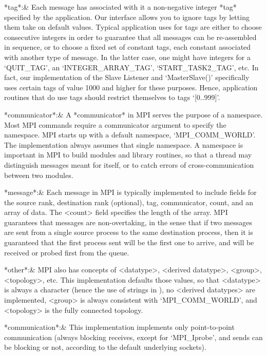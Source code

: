 *tag*:& 
    Each message has associated with  it  a  non-negative  integer  *tag*
    specified by the application. Our interface allows you to ignore tags
    by letting them take on default values. Typical application uses  for
    tags are either to choose consecutive integers in order to  guarantee
    that all messages can be re-assembled in sequence,  or  to  choose  a
    fixed set of constant tags, each  constant  associated  with  another
    type of message. In the latter case, one might have  integers  for  a
    `QUIT_TAG', an `INTEGER_ARRAY_TAG', `START_TASK2_TAG', etc. In  fact,
    our  implementation  of  the  Slave  Listener   and   `MasterSlave()'
    specifically uses certain tags of value 1000  and  higher  for  these
    purposes.  Hence,  application  routines  that  do  use  tags  should
    restrict themselves to tags `[0..999]'.

*communicator*:& 
    A *communicator* in MPI serves the purpose of a namespace.  Most  MPI
    commands require a communicator argument to  specify  the  namespace.
    MPI  starts  up  with  a  default  namespace,  `MPI_COMM_WORLD'.  The
    {\ParGAP} implementation always  assumes  that  single  namespace.  A
    namespace is important in MPI to build modules and library  routines,
    so that a thread may distinguish messages meant  for  itself,  or  to
    catch errors of cross-communication between two modules.

*message*:&
    Each message in MPI is typically implemented to  include  fields  for
    the source rank,  destination  rank  (optional),  tag,  communicator,
    count, and an array of data. The <count> field specifies  the  length
    of the array. MPI guarantees that messages are non-overtaking, in the
    sense that if two messages are sent from a single source  process  to
    the same destination process, then it is guaranteed  that  the  first
    process sent will be the first one to arrive, and will be received or
    probed first from the queue.

*other*:&
    MPI also has concepts of  <datatype>,  <derived  datatype>,  <group>,
    <topology>, etc. This implementation defaults those values,  so  that
    <datatype> is always  a  character  (hence  the  use  of  strings  in
    {\ParGAP}), no <derived datatypes> are implemented, <group> is always
    consistent  with  `MPI_COMM_WORLD',  and  <topology>  is  the   fully
    connected topology.

*communication*:&
    This  implementation  implements  only  point-to-point  communication
    (always blocking receives, except for `MPI_Iprobe', and sends can  be
    blocking or not, according to the default underlying sockets).

